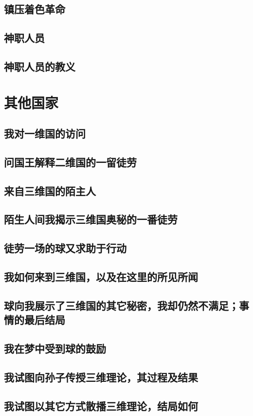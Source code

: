 \documentclass{book}
\begin{document}
\chapter{镇压着色革命}


\chapter{神职人员}


\chapter{神职人员的教义}


\part{其他国家}

\chapter{我对一维国的访问}


\chapter{问国王解释二维国的一留徒劳}


\chapter{来自三维国的陌主人}


\chapter{陌生人间我揭示三维国奥秘的一番徒劳}


\chapter{徒劳一场的球又求助于行动}


\chapter{我如何来到三维国，以及在这里的所见所闻}


\chapter{球向我展示了三维国的其它秘密，我却仍然不满足；事情的最后结局}


\chapter{我在梦中受到球的鼓励}


\chapter{我试图向孙子传授三维理论，其过程及结果}


\chapter{我试图以其它方式散播三维理论，结局如何}

\end{document}
